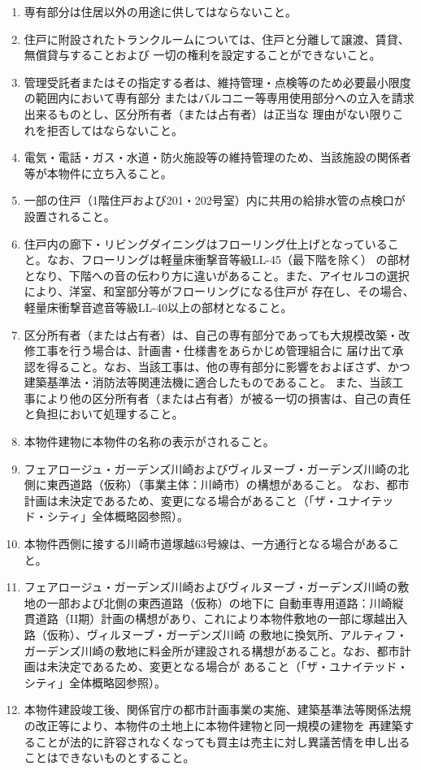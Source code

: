 \documentclass[
  luatex,
  paper=a4paper,
  fontsize=11pt,
  jafontsize=11pt,
  jlreq_notes,
]{jlreq}
\begin{document}
  \begin{enumerate}
  \item 専有部分は住居以外の用途に供してはならないこと。
  \item 住戸に附設されたトランクルームについては、住戸と分離して譲渡、賃貸、無償貸与することおよび
        一切の権利を設定することができないこと。
  \item 管理受託者またはその指定する者は、維持管理・点検等のため必要最小限度の範囲内において専有部分
        またはバルコニー等専用使用部分への立入を請求出来るものとし、区分所有者（または占有者）は正当な
        理由がない限りこれを拒否してはならないこと。
  \item 電気・電話・ガス・水道・防火施設等の維持管理のため、当該施設の関係者等が本物件に立ち入ること。
  \item 一部の住戸（1階住戸および201・202号室）内に共用の給排水管の点検口が設置されること。
  \item 住戸内の廊下・リビングダイニングはフローリング仕上げとなっていること。なお、フローリングは軽量床衝撃音等級LL-45（最下階を除く）
        の部材となり、下階への音の伝わり方に違いがあること。また、アイセルコの選択により、洋室、和室部分等がフローリングになる住戸が
        存在し、その場合、軽量床衝撃音遮音等級LL-40以上の部材となること。
  \item 区分所有者（または占有者）は、自己の専有部分であっても大規模改築・改修工事を行う場合は、計画書・仕様書をあらかじめ管理組合に
        届け出て承認を得ること。なお、当該工事は、他の専有部分に影響をおよぼさず、かつ建築基準法・消防法等関連法機に適合したものであること。
        また、当該工事により他の区分所有者（または占有者）が被る一切の損害は、自己の責任と負担において処理すること。
  \item 本物件建物に本物件の名称の表示がされること。
  \item フェアロージュ・ガーデンズ川崎およびヴィルヌーブ・ガーデンズ川崎の北側に東西道路（仮称）（事業主体：川崎市）の構想があること。
        なお、都市計画は未決定であるため、変更になる場合があること（「ザ・ユナイテッド・シティ」全体概略図参照）。
  \item 本物件西側に接する川崎市道塚越63号線は、一方通行となる場合があること。
  \item フェアロージュ・ガーデンズ川崎およびヴィルヌーブ・ガーデンズ川崎の敷地の一部および北側の東西道路（仮称）の地下に
        自動車専用道路：川崎縦貫道路（II期）計画の構想があり、これにより本物件敷地の一部に塚越出入路（仮称）、ヴィルヌーブ・ガーデンズ川崎
        の敷地に換気所、アルティフ・ガーデンズ川崎の敷地に料金所が建設される構想があること。なお、都市計画は未決定であるため、変更となる場合が
        あること（「ザ・ユナイテッド・シティ」全体概略図参照）。
  \item 本物件建設竣工後、関係官庁の都市計画事業の実施、建築基準法等関係法規の改正等により、本物件の土地上に本物件建物と同一規模の建物を
        再建築することが法的に許容されなくなっても買主は売主に対し異議苦情を申し出ることはできないものとすること。
  

\end{enumerate}
\end{document}
